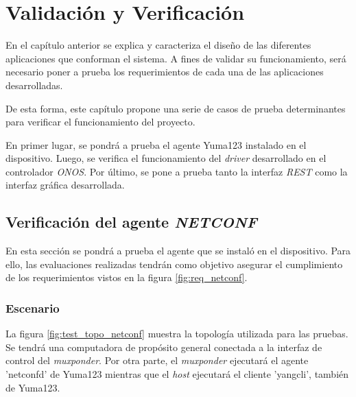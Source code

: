 
\chapter{Validación y Verificación} %
\label{Chapter5} %


En el capítulo anterior se explica y caracteriza el diseño de las diferentes aplicaciones que conforman el sistema. A fines de validar su funcionamiento, será necesario poner a prueba los requerimientos de cada una de las aplicaciones desarrolladas. 

De esta forma, este capítulo propone una serie de casos de prueba determinantes para verificar el funcionamiento del proyecto. 

En primer lugar, se pondrá a prueba el agente Yuma123 instalado en el dispositivo. Luego, se verifica el funcionamiento del \textit{driver} desarrollado en el controlador \textit{ONOS}. Por último, se pone a prueba tanto la interfaz \textit{REST} como la interfaz gráfica desarrollada.


\section{Verificación del agente \textit{NETCONF}}

En esta sección se pondrá a prueba el agente que se instaló en el dispositivo. Para ello, las evaluaciones realizadas tendrán como objetivo asegurar el cumplimiento de los requerimientos vistos en la figura \ref{fig:req_netconf}.

\subsection{Escenario}

La figura \ref{fig:test_topo_netconf} muestra la topología utilizada para las pruebas. Se tendrá una computadora de propósito general conectada a la interfaz de control del \textit{muxponder}. Por otra parte, el \textit{muxponder} ejecutará el agente 'netconfd' de Yuma123 mientras que el \textit{host} ejecutará el cliente 'yangcli', también de Yuma123.

